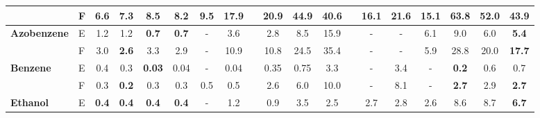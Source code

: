 \documentclass{article}
\begin{document}
\begin{table}
{\begin{tabular}{@{}llcccccccccccc | cc || ccc @{}}
       & F & \textbf{6.6}                                & 7.3                        & 8.5                                       & 8.2           &     9.5  & 17.9                  &  & 20.9                      & 44.9                     & 40.6                     &  & 16.1                         & 21.6                   & 15.1                            & 63.8            & 52.0                 & \textbf{43.9} \\
      \midrule
      \multirow{2}{*}{\textbf{Azobenzene}}
       & E & 1.2                                         & 1.2                        & \textbf{0.7}                              & \textbf{0.7}     & -   & 3.6                   &  & 2.8                       & 8.5                      & 15.9                     &  & -                            & -                      & 6.1                          & 9.0              & 6.0                  & \textbf{5.4}  \\
       & F & 3.0                                         & \textbf{2.6}               & 3.3                                       & 2.9             &   -  & 10.9                  &  & 10.8                      & 24.5                     & 35.4                     &  & -                            & -                      & 5.9                           & 28.8             & 20.0                 & \textbf{17.7} \\
      \midrule
      \multirow{2}{*}{\textbf{Benzene}}
       & E & 0.4                                         & 0.3                        & \textbf{0.03}                             & 0.04          &-       & 0.04                  &  & 0.35                      & 0.75                     & 3.3                      &  & -                            & 3.4                    & -                            &  \textbf{0.2}             & 0.6         & 0.7           \\
       & F & 0.3                                         & \textbf{0.2}               & 0.3                                       & 0.3            &    0.5  & 0.5                   &  & 2.6                       & 6.0                      & 10.0                     &  & -                            & 8.1                    & -                          & \textbf{2.7}                & 2.9                  & \textbf{2.7}  \\
      \midrule
      \multirow{2}{*}{\textbf{Ethanol}}
       & E & \textbf{0.4}                                & \textbf{0.4}               & \textbf{0.4}                              & \textbf{0.4}     & -    & 1.2                   &  & 0.9                       & 3.5                      & 2.5                      &  & 2.7                          & 2.8                    & 2.6                          & 8.6               & 8.7                  & \textbf{6.7}  \\

\end{tabular}}
\end{table}
\end{document}
